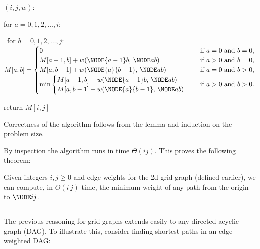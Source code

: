 \begin{myframed}
  \begin{steps}
  \item[]\shortestPath$(i, j, w)$:

    \step for $a=0,1,2,\ldots,i$: 
    \begin{block}
      \step~for $b=0,1,2,\ldots,j$: 
      \step~~~~~\(M[a, b] = 
      \begin{cases}
        0 & \text{ if } a=0 \text{ and } b=0,\\
        M[a-1, b]+ w(\NODE {a-1} b,\, \NODE a b) & \text{ if }a > 0 \text{ and } b=0, \\
        M[a, b-1]+ w(\NODE {a} {b-1},\, \NODE a b) & \text{ if } a=0  \text{ and } b > 0,\\
        \min\begin{cases}
          M[a-1, b]+ w(\NODE {a-1} b,\, \NODE a b) \\
          M[a, b-1]+ w(\NODE {a} {b-1},\, \NODE a b)
        \end{cases}
        & \text{ if } a>0 \text{ and } b> 0.
      \end{cases}
      \)
    \end{block}
    \step return $M[i, j]$
  \end{steps}
\end{myframed}

\medskip 

Correctness of the algorithm follows from the lemma and induction on the problem size.

By inspection the algorithm runs in time $\Theta(i j)$.
This proves the following theorem:

\begin{theorem}
  Given integers $i, j\ge 0$ and edge weights for the 2d grid graph (defined earlier),
  we can compute, in $O(i\,j)$ time,
  the minimum weight of any path from the origin to $\NODE i j$.
\end{theorem}


\subsection{}
The previous reasoning for grid graphs extends easily to any directed acyclic graph (DAG).
To illustrate this, consider finding shortest paths in an edge-weighted DAG:


